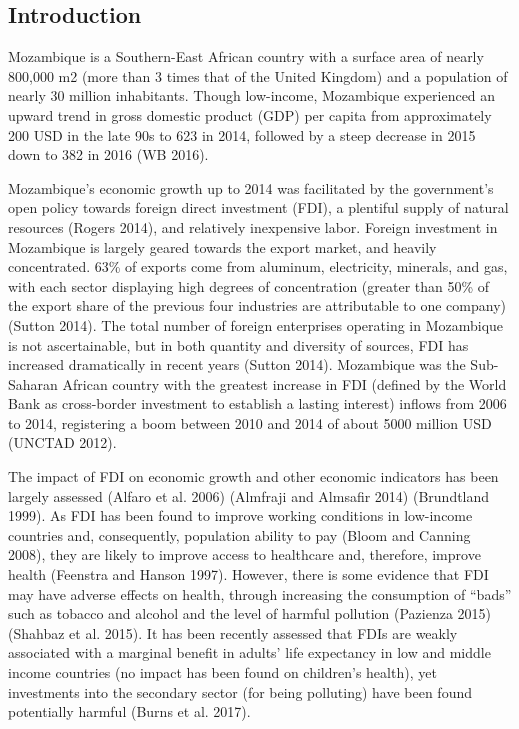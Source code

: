 \documentclass[]{article}
\begin{document}
\subsection{Introduction}\label{introduction}

Mozambique is a Southern-East African country with a surface area of
nearly 800,000 m2 (more than 3 times that of the United Kingdom) and a
population of nearly 30 million inhabitants. Though low-income,
Mozambique experienced an upward trend in gross domestic product (GDP)
per capita from approximately 200 USD in the late 90s to 623 in 2014,
followed by a steep decrease in 2015 down to 382 in 2016 (WB 2016).

Mozambique's economic growth up to 2014 was facilitated by the
government's open policy towards foreign direct investment (FDI), a
plentiful supply of natural resources (Rogers 2014), and relatively
inexpensive labor. Foreign investment in Mozambique is largely geared
towards the export market, and heavily concentrated. 63\% of exports
come from aluminum, electricity, minerals, and gas, with each sector
displaying high degrees of concentration (greater than 50\% of the
export share of the previous four industries are attributable to one
company) (Sutton 2014). The total number of foreign enterprises
operating in Mozambique is not ascertainable, but in both quantity and
diversity of sources, FDI has increased dramatically in recent years
(Sutton 2014). Mozambique was the Sub-Saharan African country with the
greatest increase in FDI (defined by the World Bank as cross-border
investment to establish a lasting interest) inflows from 2006 to 2014,
registering a boom between 2010 and 2014 of about 5000 million USD
(UNCTAD 2012).

The impact of FDI on economic growth and other economic indicators has
been largely assessed (Alfaro et al. 2006) (Almfraji and Almsafir 2014)
(Brundtland 1999). As FDI has been found to improve working conditions
in low-income countries and, consequently, population ability to pay
(Bloom and Canning 2008), they are likely to improve access to
healthcare and, therefore, improve health (Feenstra and Hanson 1997).
However, there is some evidence that FDI may have adverse effects on
health, through increasing the consumption of ``bads'' such as tobacco
and alcohol and the level of harmful pollution (Pazienza 2015) (Shahbaz
et al. 2015). It has been recently assessed that FDIs are weakly
associated with a marginal benefit in adults' life expectancy in low and
middle income countries (no impact has been found on children's health),
yet investments into the secondary sector (for being polluting) have
been found potentially harmful (Burns et al. 2017).
\end{document}
